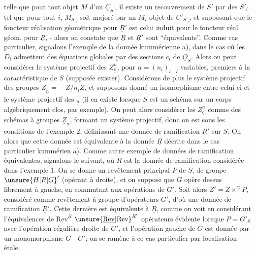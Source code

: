 telle que pour tout objet $M$ d'un $\underline{C}_{S'}$, il existe un recouvrement de $S'$ par des $S'_i$ tel que pour tout $i$, $M_{S'_i}$ soit  majoré par un $M_i$ objet de $\underline{C}'_{S'_i}$,  et supposant que le foncteur réalisation géométrique pour $\underline{R}'$ est celui induit pour le foncteur réal. géom. pour $\underline{R}$, - alors on constate que $\underline{R}$ et $\underline{R}'$ sont ``équivalents''. Comme cas particulier, signalons l'exemple de la donnée kummérienne a), dans le cas où les $D_i$ admettent des équations globales par des sections $c_i$ de $\underline{O}_S$. Alors on peut considérer le système projectif des $Z_{\underline{c}}^{\underline{n}}$, pour $\underline{n}=(n_i)_{i\quad I}$ variables, premiers  à la caractéristique de $S$ (supposée exister). Considérons de plus le système projectif des groupes $\underline{Z}_{\underline{n}}=\quad\underline{Z}/n_i\underline{Z}$, et supposons donné un isomorphisme entre celui-ci et le système projectif des ${}_{\underline{n}}$ (il en existe lorsque $S$ est un schéma sur un corps algébriquement clos, par exemple). On peut alors considérer les $Z_{\underline{c}}^{\underline{n}}$ comme des schémas à groupes $\underline{Z}_{\underline{n}}$, formant un système projectif,  donc on est sous les conditions de l'exemple 2, définissant une donnée de ramification $\underline{R}'$ sur $S$. On  alors que cette donnée est équivalente à la donnée $\underline{R}$ décrite dans le cas particulier kummérien a). Comme autre exemple de données de ramification équivalentes\deleted{\unsure{:|;}}, signalons le suivant, où $\underline{R}$ est la donnée de ramification considérée dans l'exemple 1. On se donne un revêtement principal $P$ de $S$, de groupe ${\unsure{H|R|G}}'$ (opérant à droite), et on suppose que $G$ opère dessus librement à gauche, en commutant aux opérations de $G'$. Soit alors $Z'=Z\times^{G}P$, considéré comme revêtement à groupe d'opérateurs $G'$, d'où une donnée de ramification $\underline{R}'$. Cette dernière est équivalente à $\underline{R}$, comme on voit en considérant l'équivalences  de   $\underline{\mathrm{Rev}}^{\underline{R}}$  ${\unsure{\underline{\mathrm{Rev}}|\mathrm{Rev}}}^{R'}$ opérateurs 
évidente lorsque $P=G'_S$ avec l'opération régulière droite de $G'$, et l'opération gauche de $G$ est donnée par un monomorphisme $G\quad G'$; on se ramène à ce cas particulier par localisation étale.


